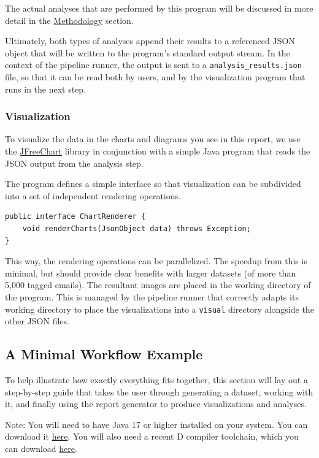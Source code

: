 \documentclass[a4paper, 12pt]{article}
\begin{document}
			The actual analyses that are performed by this program will be discussed in more detail in the \hyperref[sec:methodology]{Methodology} section.
		
			Ultimately, both types of analyses append their results to a referenced JSON object that will be written to the program's standard output stream. In the context of the pipeline runner, the output is sent to a \texttt{analysis\_results.json} file, so that it can be read both by users, and by the visualization program that runs in the next step.
			
		\newpage
		\subsubsection{Visualization}
			To visualize the data in the charts and diagrams you see in this report, we use the \href{https://www.jfree.org/jfreechart/}{JFreeChart} library in conjunction with a simple Java program that reads the JSON output from the analysis step.
			
			The program defines a simple interface so that visualization can be subdivided into a set of independent rendering operations.
			
			\begin{verbatim}
public interface ChartRenderer {
	void renderCharts(JsonObject data) throws Exception;
}
			\end{verbatim}
		
			This way, the rendering operations can be parallelized. The speedup from this is minimal, but should provide clear benefits with larger datasets (of more than 5,000 tagged emails). The resultant images are placed in the working directory of the program. This is managed by the pipeline runner that correctly adapts its working directory to place the visualizations into a \texttt{visual} directory alongside the other JSON files.
			
	\newpage
	\subsection{A Minimal Workflow Example}
		To help illustrate how exactly everything fits together, this section will lay out a step-by-step guide that takes the user through generating a dataset, working with it, and finally using the report generator to produce visualizations and analyses.
		
		\footnotesize
		Note: You will need to have Java 17 or higher installed on your system. You can download it \href{https://adoptium.net/temurin/releases}{here}. You will also need a recent D compiler toolchain, which you can download \href{https://dlang.org/download.html}{here}.
		\normalsize
		
\end{document}
